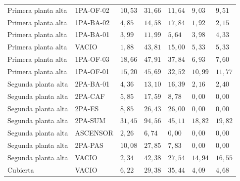 {\begin{longtable}{p{2.8cm}p{2.2cm}p{1.4cm}p{1.5cm}p{1.4cm}p{1.5cm}p{1.5cm}}
  Primera planta alta & 1PA-OF-02 & $10,53$ & $31,66$ & $11,64$ & $9,03$ & $9,51$ \\
  Primera planta alta & 1PA-BA-02 & $4,85$ & $14,58$ & $17,84$ & $1,92$ & $2,15$ \\
  Primera planta alta & 1PA-BA-01 & $3,99$ & $11,99$ & $5,64$ & $3,98$ & $4,33$ \\
  Primera planta alta & VACIO & $1,88$ & $43,81$ & $15,00$ & $5,33$ & $5,33$ \\
  Primera planta alta & 1PA-OF-03 & $18,66$ & $47,91$ & $37,84$ & $6,93$ & $7,60$ \\
  Primera planta alta & 1PA-OF-01 & $15,20$ & $45,69$ & $32,52$ & $10,99$ & $11,77$ \\
  Segunda planta alta & 2PA-BA-01 & $4,36$ & $13,10$ & $16,39$ & $2,16$ & $2,40$ \\
  Segunda planta alta & 2PA-CAF & $5,85$ & $17,59$ & $8,78$ & $0,00$ & $0,00$ \\
  Segunda planta alta & 2PA-ES & $8,85$ & $26,43$ & $26,00$ & $0,00$ & $0,00$ \\
  Segunda planta alta & 2PA-SUM & $31,45$ & $94,56$ & $45,11$ & $18,82$ & $19,82$ \\
  Segunda planta alta & ASCENSOR & $2,26$ & $6,74$ & $0,00$ & $0,00$ & $0,00$ \\
  Segunda planta alta & 2PA-PAS & $10,08$ & $27,85$ & $7,83$ & $0,00$ & $0,00$ \\
  Segunda planta alta & VACIO & $2,34$ & $42,38$ & $27,54$ & $14,94$ & $16,55$ \\
  Cubierta & VACIO & $6,22$ & $29,38$ & $35,44$ & $4,09$ & $4,68$ \\
\end{longtable}
}

